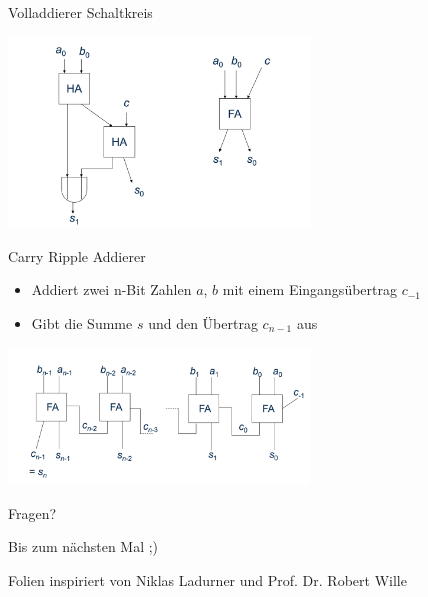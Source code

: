 \documentclass[
  german,            %
  aspectratio=169,    %
]{tumbeamer}
\begin{document}
\begin{frame}[c, fragile]{Volladdierer Schaltkreis}{}
  \begin{center}
    \includegraphics[width=0.6\textwidth]{w06_volladdierer.png}
  \end{center}
\end{frame}

\begin{frame}[c, fragile]{Carry Ripple Addierer}{}
  \begin{itemize}
    \item Addiert zwei n-Bit Zahlen $a$, $b$ mit einem Eingangsübertrag $c_{-1}$
    \item Gibt die Summe $s$ und den Übertrag $c_{n-1}$ aus
  \end{itemize}
  \begin{center}
    \includegraphics[width=0.6\textwidth]{w06_carry_ripple_addierer.png}
  \end{center}
\end{frame}

\begin{frame}[c]{}{}
  \begin{center}
    \LARGE Fragen?
  \end{center}
  \vspace{0.5cm}
  \begin{center}
    \LARGE Bis zum nächsten Mal ;) \\
  \end{center}
  \vspace{1.0cm}
  \begin{center}
    \small Folien inspiriert von Niklas Ladurner und Prof. Dr. Robert Wille
  \end{center}
\end{frame}
\end{document}
